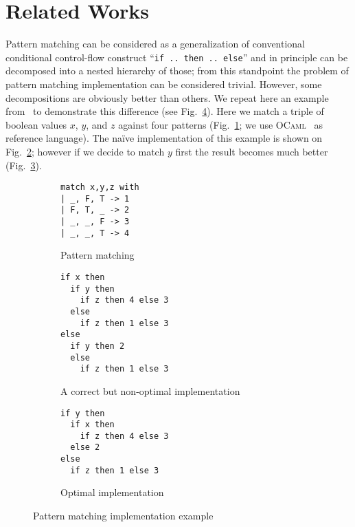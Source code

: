 \section{Related Works}
\label{sec:related}

Pattern matching can be considered as a generalization of conventional conditional control-flow construct ``\lstinline|if .. then .. else|'' and in principle
can be decomposed into a nested hierarchy of those; from this standpoint the problem of pattern matching implementation can be considered trivial. However,
some decompositions are obviously better than others. We repeat here an example from~\cite{maranget2008} to demonstrate this difference (see Fig.~\ref{fig:match-example}).
Here we match a triple of boolean values $x$, $y$, and $z$ against four patterns (Fig.~\ref{fig:matching-example1}; we use \textsc{OCaml}~\cite{ocaml} as
reference language). The na\"{i}ve implementation of this example is shown on Fig.~\ref{fig:matching-example2}; however if we decide to match $y$ first the result
becomes much better (Fig.~\ref{fig:matching-example3}).

\begin{figure}[t]
\begin{subfigure}[t]{0.25\linewidth}
\centering
\begin{lstlisting}
match x,y,z with
| _, F, T -> 1
| F, T, _ -> 2
| _, _, F -> 3
| _, _, T -> 4
\end{lstlisting}
\vskip18.5mm
\caption{Pattern matching}
\label{fig:matching-example1}
\end{subfigure}
\hspace{0.5cm}
\begin{subfigure}[t]{0.3\linewidth}
\centering
\begin{lstlisting}
if x then
  if y then
    if z then 4 else 3
  else
    if z then 1 else 3
else
  if y then 2
  else
    if z then 1 else 3
\end{lstlisting}
\caption{A correct but non-optimal implementation}
\label{fig:matching-example2}
\end{subfigure}
\hspace{1.0cm}
\begin{subfigure}[t]{0.3\linewidth}
\centering
\begin{lstlisting}
if y then
  if x then
    if z then 4 else 3
  else 2
else
  if z then 1 else 3
\end{lstlisting}
\vskip13.5mm
\caption{Optimal implementation}
\label{fig:matching-example3}
\end{subfigure}
\caption{Pattern matching implementation example} 
\label{fig:match-example}
\end{figure}

